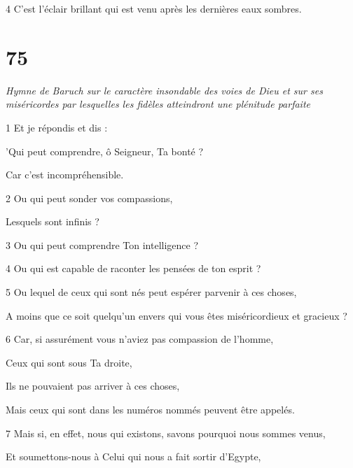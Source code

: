 \par 4 C'est l'éclair brillant qui est venu après les dernières eaux sombres.

\chapter{75}

\par \textit{Hymne de Baruch sur le caractère insondable des voies de Dieu et sur ses miséricordes par lesquelles les fidèles atteindront une plénitude parfaite}

\par 1 Et je répondis et dis :

\par 'Qui peut comprendre, ô Seigneur, Ta bonté ?

\par Car c'est incompréhensible.

\par 2 Ou qui peut sonder vos compassions,

\par Lesquels sont infinis ?

\par 3 Ou qui peut comprendre Ton intelligence ?

\par 4 Ou qui est capable de raconter les pensées de ton esprit ?

\par 5 Ou lequel de ceux qui sont nés peut espérer parvenir à ces choses,

\par A moins que ce soit quelqu'un envers qui vous êtes miséricordieux et gracieux ?

\par 6 Car, si assurément vous n'aviez pas compassion de l'homme,

\par Ceux qui sont sous Ta droite,

\par Ils ne pouvaient pas arriver à ces choses,

\par Mais ceux qui sont dans les numéros nommés peuvent être appelés.

\par 7 Mais si, en effet, nous qui existons, savons pourquoi nous sommes venus,

\par Et soumettons-nous à Celui qui nous a fait sortir d'Egypte,

